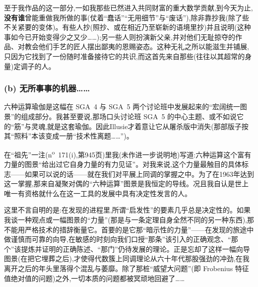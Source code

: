 至于我作品的这一部分,一如我那些已然进入共同财富的重大数学贡献,到今天为止,\textbf{没有谁}曾能重做我所做的事(仗着“蠢话”“无用细节”与“废话”),除非靠抄我(除了些不关紧要的变体)。有些人抄(照抄、或在相近乃至崭新的语境里抄)并且说明(这种事如今已开始变得少之又少……);另一些人则扮演新父亲,并对他们无耻掠夺的作品、\dmark{}对教会他们手艺的匠人摆出鄙夷的恩赐姿态。这种无礼之所以能滋生并铺展,只因为它找到了一份随时准备接待它的共识,而这首先来自那些(往往以其超常的身量)定调子的人。

\subsubsection*{(b) 无所事事的机器……}


六种运算瑜伽是这幅在 SGA~4 与 SGA~5 两个讨论班中发展起来的“宏阔统一图景”的组成部分。我甚至要说,那场口头讨论班 SGA~5 的中心主题、或不如说它的“筋”与灵魂,就是这套瑜伽。因此Illusie才着意让它从屠杀版中消失(那部版子按其“照料”本该变成一册“技术性离题……”)。

在“祖先”一注(n\textsuperscript{o}~171(i),第945页)里我(未作进一步说明地)写道:六种运算这个富有力量的图景“给出过它自身力量的有力见证”。对我来说,这个力量最触目的具体标志——如果可以说的话——就在我们对平展上同调的掌握之中。为了在1963年达到这一掌握,那来自凝聚对偶的“六种运算”图景是我恒定的导线。况且我自认是世上唯一有资格就什么在这一工具的发展中具有决定性发言的人。

这里不言自明的是:在发现的进程里,所谓“启发性”的要素几乎总是决定性的。如果我谈一种观点或一幅图景的“力量”(那是与一条定理自身全然不同的另一种东西),那不能用严格技术的措辞衡量它。首要的是它那“暗示性的力量”——在发现的旅途中做谨慎而可靠的向导,在敏感的时刻向我们口授“那条”该引入的正确观念、“那个”该提炼并证明的正确陈述、“那门”仍待发展的理论。正是忘却了这样一幅向导图景(在把它埋葬之后),才使得代数簇上同调理论从六十年代那股强劲的冲劲,在我离开之后的年头里落得个混乱与萎靡。除了那桩“威望大问题”(即 Frobenius 特征值绝对值的问题)之外,一切本质的问题都被冥顽地回避了……

